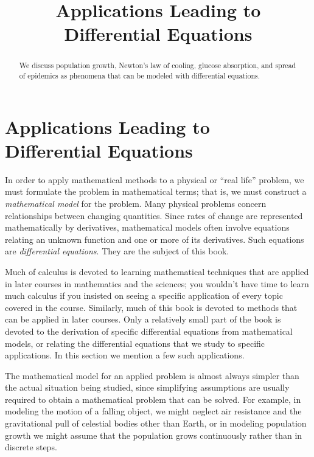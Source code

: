 \documentclass{ximera}
\title{Applications Leading to Differential Equations}
\begin{document}
 
\begin{abstract}
We discuss population growth, Newton's law of cooling, glucose absorption, and spread of epidemics as phenomena that can be modeled with differential equations.
\end{abstract}
 
\maketitle
 
\section*{Applications Leading to Differential Equations}
 
In order to apply mathematical methods to a physical or ``real life''
problem, we must  formulate the problem in mathematical
terms; that is, we must construct a \textit{mathematical
model} for the
problem. Many physical problems concern relationships between changing
quantities. Since rates of change are represented mathematically by
derivatives, mathematical models often involve equations relating an
unknown function and one or more of its derivatives. Such equations
are  \textit{differential equations}. They are the subject of this
book.
 
Much of calculus is devoted to learning mathematical techniques that
are applied in later courses in mathematics and the sciences;     you
wouldn't have time to learn much calculus if you insisted on seeing
a specific application of every topic covered in the course.
Similarly, much of this book is devoted to methods that can be applied
in later courses. Only a relatively small part of the book is devoted
to the derivation of specific differential equations from mathematical
models, or relating the differential equations that we study to
specific applications. In this section we mention a few such
applications.
 
The mathematical model for an applied problem is almost always simpler
than the actual situation being studied, since simplifying assumptions
are usually required to obtain a mathematical problem that can be
solved. For example, in modeling the motion of a falling object, we
might neglect air resistance and the gravitational pull of celestial
bodies other than Earth, or in  modeling  population growth we
might assume that the population grows continuously rather than in
discrete steps.
 
\end{document}
